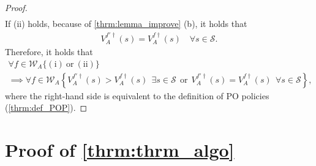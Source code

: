 \documentclass{acml}
\begin{document}
\begin{proof}
\begin{align}
	\end{align}
	If (ii) holds, because of \cref{thrm:lemma_improve} (b), it holds that
	\begin{align}
		V_A^{f'\dag}(s)=V_A^{f\dag}(s)\quad\forall s\in\mathcal{S}.\label{eq:(ii)implies}
	\end{align}
Therefore, it holds that
	\begin{multline}
		\forall f\in \mathcal{W}_A \{\mathrm{(i)~or~(ii)}\}\\
		\implies \forall f\in \mathcal{W}_A \left\{ V_A^{f'\dag}(s)>V_A^{f\dag}(s)~~\exists s\in\mathcal{S} \mathrm{~~or~~} V_A^{f'\dag}(s)=V_A^{f\dag}(s)~~\forall s\in\mathcal{S}\right\}\label{eq:def_POP_alt},
	\end{multline}
	where the right-hand side is equivalent to the definition of PO policies (\cref{thrm:def_POP}).
\end{proof}


\section{Proof of \texorpdfstring{\cref{thrm:thrm_algo}}{Lg}}\label{apdx:thrm_algo}
\end{document}
